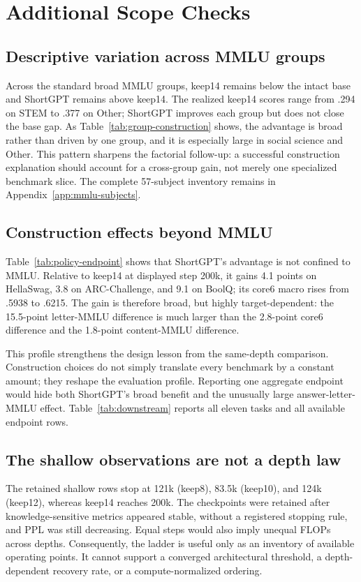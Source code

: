\section{Additional Scope Checks}
\label{sec:analysis}

\subsection{Descriptive variation across MMLU groups}


Across the standard broad MMLU groups, keep14 remains below the intact base and
ShortGPT remains above keep14. The realized keep14 scores range from .294 on
STEM to .377 on Other; ShortGPT improves each group but does not close the
base gap. As Table~\ref{tab:group-construction} shows, the advantage is broad
rather than driven by one group, and it is especially large in social science
and Other. This pattern sharpens the factorial follow-up: a successful
construction explanation should account for a cross-group gain, not merely one
specialized benchmark slice. The complete 57-subject inventory remains in
Appendix~\ref{app:mmlu-subjects}.

\subsection{Construction effects beyond MMLU}


Table~\ref{tab:policy-endpoint} shows that ShortGPT's advantage is not confined
to MMLU. Relative to keep14 at displayed step 200k, it gains 4.1 points on
HellaSwag, 3.8 on ARC-Challenge, and 9.1 on BoolQ; its core6 macro rises from
.5938 to .6215. The gain is therefore broad, but highly target-dependent: the
15.5-point letter-MMLU difference is much larger than the 2.8-point core6
difference and the 1.8-point content-MMLU difference.

This profile strengthens the design lesson from the same-depth comparison.
Construction choices do not simply translate every benchmark by a constant
amount; they reshape the evaluation profile. Reporting one aggregate endpoint
would hide both ShortGPT's broad benefit and the unusually large
answer-letter-MMLU effect. Table~\ref{tab:downstream} reports all eleven tasks
and all available endpoint rows.

\subsection{The shallow observations are not a depth law}
The retained shallow rows stop at 121k (keep8), 83.5k (keep10), and 124k
(keep12), whereas keep14 reaches 200k. The checkpoints were retained after
knowledge-sensitive metrics appeared stable, without a registered stopping
rule, and PPL was still decreasing. Equal steps would also imply unequal FLOPs
across depths. Consequently, the ladder is useful only as an inventory of
available operating points. It cannot support a converged architectural
threshold, a depth-dependent recovery rate, or a compute-normalized ordering.

